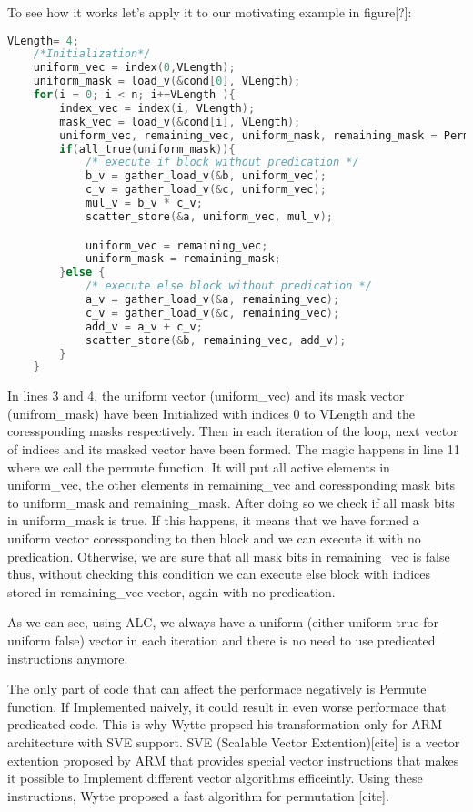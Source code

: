 \documentclass[\main/thesis.tex]{subfiles}
\begin{document}
To see how it works let's apply it to our motivating example in figure[?]:
\begin{lstlisting}[language=C]
    VLength= 4;
    /*Initialization*/
    uniform_vec = index(0,VLength);
    uniform_mask = load_v(&cond[0], VLength);
    for(i = 0; i < n; i+=VLength ){
        index_vec = index(i, VLength);
        mask_vec = load_v(&cond[i], VLength);
        uniform_vec, remaining_vec, uniform_mask, remaining_mask = Permute(uniform_vec, index_vec, uniform_mask, mask_vec);        
        if(all_true(uniform_mask)){
            /* execute if block without predication */
            b_v = gather_load_v(&b, uniform_vec);
            c_v = gather_load_v(&c, uniform_vec);
            mul_v = b_v * c_v;
            scatter_store(&a, uniform_vec, mul_v);

            uniform_vec = remaining_vec;
            uniform_mask = remaining_mask;
        }else {     
            /* execute else block without predication */
            a_v = gather_load_v(&a, remaining_vec);
            c_v = gather_load_v(&c, remaining_vec);
            add_v = a_v + c_v;
            scatter_store(&b, remaining_vec, add_v);
        } 
    }
\end{lstlisting}

In lines 3 and 4, the uniform vector (uniform\_vec) and its mask vector (unifrom\_mask) have been Initialized with indices 0 to VLength and the coressponding masks respectively.
Then in each iteration of the loop, next vector of indices and its masked vector have been formed. The magic happens in line 11 where we call the permute function. It will put all active elements in uniform\_vec, the other elements in remaining\_vec and coressponding mask bits to uniform\_mask and remaining\_mask.
After doing so we check if all mask bits in uniform\_mask is true. If this happens, it means that we have formed a uniform vector coressponding to then block and we can execute it with no predication. Otherwise, we are sure that all mask bits in remaining\_vec is false thus, without checking this condition we can 
execute else block with indices stored in remaining\_vec vector, again with no predication.

As we can see, using ALC, we always have a uniform (either uniform true for uniform false) vector in each iteration and there is no need to use predicated instructions anymore. 

The only part of code that can affect the performace negatively is Permute function. If Implemented naively, it could result in even worse performace that predicated code. This is why Wytte propsed his transformation only for ARM architecture with SVE support. SVE (Scalable Vector Extention)[cite] is a vector extention
proposed by ARM that provides special vector instructions that makes it possible to Implement different vector algorithms efficeintly. Using these instructions, Wytte proposed a fast algorithm for permutation [cite].
\end{document}
